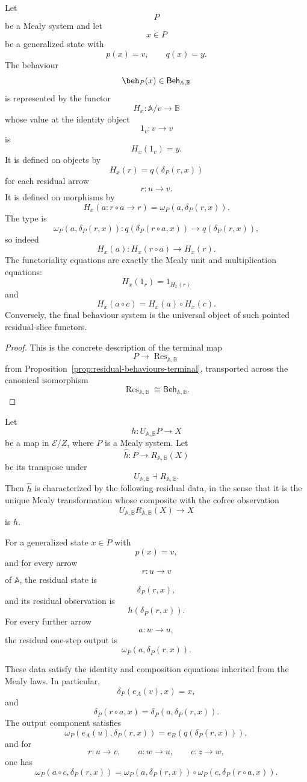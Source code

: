 \begin{proposition}
\label{prop:behaviours-as-residual-slice-functors}
Let
\[
P
\]
be a Mealy system and let
\[
x\in P
\]
be a generalized state with
\[
p(x)=v,
\qquad
q(x)=y.
\]
The behaviour
\[
\beh_P(x)\in\mathsf{Beh}_{\mathbb A,\mathbb B}
\]
is represented by the functor
\[
H_x:\mathbb A/v\to\mathbb B
\]
whose value at the identity object
\[
1_v:v\to v
\]
is
\[
H_x(1_v)=y.
\]
It is defined on objects by
\[
H_x(r)=q(\delta_P(r,x))
\]
for each residual arrow
\[
r:u\to v.
\]
It is defined on morphisms by
\[
H_x(a:r\circ a\to r)
=
\omega_P(a,\delta_P(r,x)).
\]
The type is
\[
\omega_P(a,\delta_P(r,x)):
q(\delta_P(r\circ a,x))
\to
q(\delta_P(r,x)),
\]
so indeed
\[
H_x(a):H_x(r\circ a)\to H_x(r).
\]
The functoriality equations are exactly the Mealy unit and multiplication
equations:
\[
H_x(1_r)=1_{H_x(r)}
\]
and
\[
H_x(a\circ c)=H_x(a)\circ H_x(c).
\]
Conversely, the final behaviour system is the universal object of such
pointed residual-slice functors.
\end{proposition}

\begin{proof}
This is the concrete description of the terminal map
\[
P\to\operatorname{Res}_{\mathbb A,\mathbb B}
\]
from Proposition~\ref{prop:residual-behaviours-terminal}, transported across
the canonical isomorphism
\[
\operatorname{Res}_{\mathbb A,\mathbb B}
\cong
\mathsf{Beh}_{\mathbb A,\mathbb B}.
\]
\end{proof}

\begin{proposition}
\label{prop:cofree-transpose-residual-form}
Let
\[
h:U_{\mathbb A,\mathbb B}P\to X
\]
be a map in \(\mathcal E/Z\), where \(P\) is a Mealy system. Let
\[
\widehat h:P\to R_{\mathbb A,\mathbb B}(X)
\]
be its transpose under
\[
U_{\mathbb A,\mathbb B}\dashv R_{\mathbb A,\mathbb B}.
\]
Then \(\widehat h\) is characterized by the following residual data, in the
sense that it is the unique Mealy transformation whose composite with the
cofree observation
\[
U_{\mathbb A,\mathbb B}R_{\mathbb A,\mathbb B}(X)\to X
\]
is \(h\).

For a generalized state \(x\in P\) with
\[
p(x)=v,
\]
and for every arrow
\[
r:u\to v
\]
of \(\mathbb A\), the residual state is
\[
\delta_P(r,x),
\]
and its residual observation is
\[
h(\delta_P(r,x)).
\]
For every further arrow
\[
a:w\to u,
\]
the residual one-step output is
\[
\omega_P(a,\delta_P(r,x)).
\]

These data satisfy the identity and composition equations inherited from the
Mealy laws. In particular,
\[
\delta_P(e_A(v),x)=x,
\]
and
\[
\delta_P(r\circ a,x)=\delta_P(a,\delta_P(r,x)).
\]
The output component satisfies
\[
\omega_P(e_A(u),\delta_P(r,x))
=
e_B(q(\delta_P(r,x))),
\]
and for
\[
r:u\to v,
\qquad
a:w\to u,
\qquad
c:z\to w,
\]
one has
\[
\omega_P(a\circ c,\delta_P(r,x))
=
\omega_P(a,\delta_P(r,x))
\circ
\omega_P(c,\delta_P(r\circ a,x)).
\]
\end{proposition}

